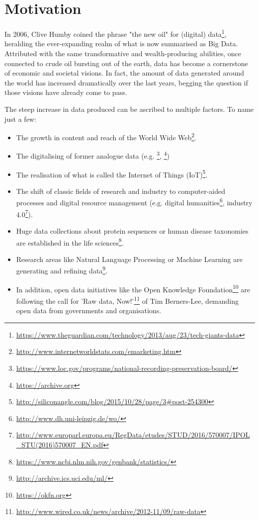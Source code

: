 \documentclass[a4paper,english,twoside,BCOR1.5cm,headsepline,DIV12,appendixprefix,final,12pt]{scrbook}
\newcommand\footnoteurl[1]{\footnote{\scriptsize\url{#1}}}
\begin{document}
\section{Motivation}
\label{sec:motivation}
In 2006, Clive Humby coined the phrase "the new oil" for (digital) data\footnoteurl{https://www.theguardian.com/technology/2013/aug/23/tech-giants-data}, heralding the ever-expanding realm of what is now summarised as Big Data. Attributed with the same transformative and wealth-producing abilities, once connected to crude oil bursting out of the earth, data has become a cornerstone of economic and societal visions. In fact, the amount of data generated around the world has increased dramatically over the last years, begging the question if those visions have already come to pass. 

The steep increase in data produced can be ascribed to multiple factors. To name just a few:
\begin{itemize}
\item The growth in content and reach of the World Wide Web\footnoteurl{http://www.internetworldstats.com/emarketing.htm}.
\item The digitalising of former analogue data (e.g. \footnoteurl{https://www.loc.gov/programs/national-recording-preservation-board/}, \footnoteurl{https://archive.org})
\item The realisation of what is called the Internet of Things (IoT)\footnoteurl{http://siliconangle.com/blog/2015/10/28/page/3\#post-254300}.
\item The shift of classic fields of research and industry to computer-aided processes and digital resource management (e.g. digital humanities\footnoteurl{http://www.dh.uni-leipzig.de/wo/}, industry 4.0\footnoteurl{http://www.europarl.europa.eu/RegData/etudes/STUD/2016/570007/IPOL_STU(2016)570007_EN.pdf}).
\item Huge data collections about protein sequences or human disease taxonomies are established in the life sciences\footnoteurl{https://www.ncbi.nlm.nih.gov/genbank/statistics/}.
\item Research areas like Natural Language Processing or Machine Learning are generating and refining data\footnoteurl{http://archive.ics.uci.edu/ml/}. 
\item In addition, open data initiatives like the Open Knowledge Foundation\footnoteurl{https://okfn.org} are following the call for 'Raw data, Now!'\footnoteurl{http://www.wired.co.uk/news/archive/2012-11/09/raw-data} of Tim Berners-Lee, demanding open data from governments and organisations.
\end{itemize} 
\end{document}
